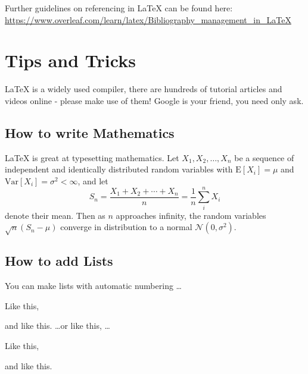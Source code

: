 \documentclass[twocolumn]{article} %
\let\tempone\itemize
\let\temptwo\enditemize
\let\tempthree\enumerate
\let\tempfour\endenumerate
\renewenvironment{itemize}{\tempone\setlength{\itemsep}{0pt}}{\temptwo}
\renewenvironment{enumerate}{\tempthree\setlength{\itemsep}{0pt}}{\tempfour}
\begin{document}
Further guidelines on referencing in LaTeX can be found here:
\url{https://www.overleaf.com/learn/latex/Bibliography\_management\_in\_LaTeX}

\section*{Tips and Tricks} %

\LaTeX{} is a widely used compiler, there are hundreds of tutorial articles and videos online - please make use of them! Google is your friend, you need only ask.


\subsection*{How to write Mathematics} %

\LaTeX{} is great at typesetting mathematics. Let $X_1, X_2, \ldots,
X_n$ be a sequence of independent and identically distributed random
variables with $\text{E}[X_i] = \mu$ and $\text{Var}[X_i] = \sigma^2 <
\infty$, and let
\[S_n = \frac{X_1 + X_2 + \cdots + X_n}{n}
      = \frac{1}{n}\sum_{i}^{n} X_i\]
denote their mean. Then as $n$ approaches infinity, the random
variables $\sqrt{n}(S_n - \mu)$ converge in distribution to a normal
$\mathcal{N}(0, \sigma^2)$.

\subsection*{How to add Lists} %

You can make lists with automatic numbering \dots

\begin{enumerate} %
\item Like this,
\item and like this.
\end{enumerate}
\dots or like this, \dots
\begin{itemize} %
\item Like this,
\item and like this.
\end{itemize}



\end{document}
